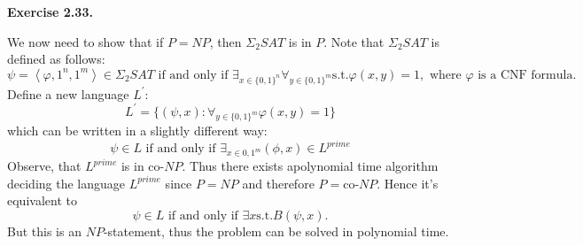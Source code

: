 \documentclass[a4paper]{article}
\newenvironment{exercise}[1]{
	\par
	\noindent\textbf{Exercise #1.}\quad
}{
	\par
	\bigskip
}
\begin{document}
\begin{exercise}{2.33}	
	We now need to show that if $P=NP$, then $\Sigma_2 SAT$ is in $P$. Note that $\Sigma_2 SAT$ is defined as follows:
	\begin{equation*}
	 \psi=\left\langle \varphi,1^{n},1^{m} \right\rangle \in  \Sigma_2 SAT  \text{   if and only if   } \exists_{x\in \{0,1\}^n} \forall_{y \in \{0,1 \}^m} \text{s.t.} \varphi(x,y)=1,\text{  where }\varphi \text{ is a CNF formula.} 
	\end{equation*}
	Define a new language $L^{\prime}$:
	\begin{equation*}
	     	L^{\prime}=\{(\psi,x): \forall_{y \in \{0,1\}^m} \varphi(x,y)=1\}
	\end{equation*}
	which can be written in a slightly different way:
	\begin{equation*}
		\psi \in L \text{  if and only if  } \exists_{x \in {0,1}^m} (\phi,x) \in L^{prime}
	\end{equation*}
	Observe, that $L^{prime}$ is in co-$NP$. Thus there exists apolynomial time algorithm deciding the language $L^{prime}$ since $P=NP$ and therefore $P=$co-$NP$. Hence it's equivalent to 
	\begin{equation*}
	       \psi \in L \text{  if and only if  } \exists x \text{s.t.} B(\psi,x). 
	\end{equation*}
	But this is an $NP$-statement, thus the problem can be solved in polynomial time.
\end{exercise}
\end{document}
